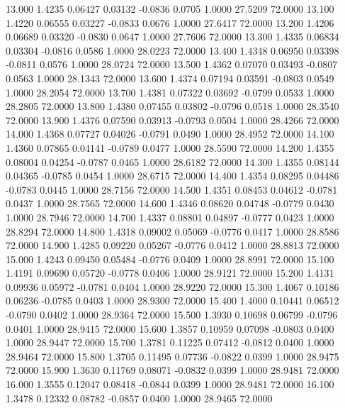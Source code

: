   13.000   1.4235   0.06427   0.03132  -0.0836   0.0705   1.0000  27.5209  72.0000
  13.100   1.4220   0.06555   0.03227  -0.0833   0.0676   1.0000  27.6417  72.0000
  13.200   1.4206   0.06689   0.03320  -0.0830   0.0647   1.0000  27.7606  72.0000
  13.300   1.4335   0.06834   0.03304  -0.0816   0.0586   1.0000  28.0223  72.0000
  13.400   1.4348   0.06950   0.03398  -0.0811   0.0576   1.0000  28.0724  72.0000
  13.500   1.4362   0.07070   0.03493  -0.0807   0.0563   1.0000  28.1343  72.0000
  13.600   1.4374   0.07194   0.03591  -0.0803   0.0549   1.0000  28.2054  72.0000
  13.700   1.4381   0.07322   0.03692  -0.0799   0.0533   1.0000  28.2805  72.0000
  13.800   1.4380   0.07455   0.03802  -0.0796   0.0518   1.0000  28.3540  72.0000
  13.900   1.4376   0.07590   0.03913  -0.0793   0.0504   1.0000  28.4266  72.0000
  14.000   1.4368   0.07727   0.04026  -0.0791   0.0490   1.0000  28.4952  72.0000
  14.100   1.4360   0.07865   0.04141  -0.0789   0.0477   1.0000  28.5590  72.0000
  14.200   1.4355   0.08004   0.04254  -0.0787   0.0465   1.0000  28.6182  72.0000
  14.300   1.4355   0.08144   0.04365  -0.0785   0.0454   1.0000  28.6715  72.0000
  14.400   1.4354   0.08295   0.04486  -0.0783   0.0445   1.0000  28.7156  72.0000
  14.500   1.4351   0.08453   0.04612  -0.0781   0.0437   1.0000  28.7565  72.0000
  14.600   1.4346   0.08620   0.04748  -0.0779   0.0430   1.0000  28.7946  72.0000
  14.700   1.4337   0.08801   0.04897  -0.0777   0.0423   1.0000  28.8294  72.0000
  14.800   1.4318   0.09002   0.05069  -0.0776   0.0417   1.0000  28.8586  72.0000
  14.900   1.4285   0.09220   0.05267  -0.0776   0.0412   1.0000  28.8813  72.0000
  15.000   1.4243   0.09450   0.05484  -0.0776   0.0409   1.0000  28.8991  72.0000
  15.100   1.4191   0.09690   0.05720  -0.0778   0.0406   1.0000  28.9121  72.0000
  15.200   1.4131   0.09936   0.05972  -0.0781   0.0404   1.0000  28.9220  72.0000
  15.300   1.4067   0.10186   0.06236  -0.0785   0.0403   1.0000  28.9300  72.0000
  15.400   1.4000   0.10441   0.06512  -0.0790   0.0402   1.0000  28.9364  72.0000
  15.500   1.3930   0.10698   0.06799  -0.0796   0.0401   1.0000  28.9415  72.0000
  15.600   1.3857   0.10959   0.07098  -0.0803   0.0400   1.0000  28.9447  72.0000
  15.700   1.3781   0.11225   0.07412  -0.0812   0.0400   1.0000  28.9464  72.0000
  15.800   1.3705   0.11495   0.07736  -0.0822   0.0399   1.0000  28.9475  72.0000
  15.900   1.3630   0.11769   0.08071  -0.0832   0.0399   1.0000  28.9481  72.0000
  16.000   1.3555   0.12047   0.08418  -0.0844   0.0399   1.0000  28.9481  72.0000
  16.100   1.3478   0.12332   0.08782  -0.0857   0.0400   1.0000  28.9465  72.0000
